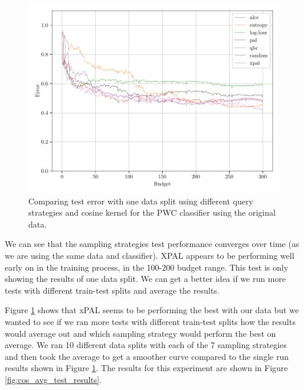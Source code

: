 \begin{figure}[ht]
    \centering
    \includegraphics[width=\textwidth]{../img/plot_text_data_original_compare_stratagies_test_results}
    \caption{Comparing test error with one data split using different query strategies and cosine kernel for the PWC classifier using the original data.}
    \label{fig:cos_test_results}
\end{figure}

We can see that the sampling strategies test performance converges over time (as we are using the same data and classifier). XPAL appears to be performing well early on in the training process, in the 100-200 budget range. This test is only showing the results of one data split. We can get a better idea if we run more tests with different train-test splits and average the results.

Figure \ref{fig:cos_test_results} shows that xPAL seems to be performing the best with our data but we wanted to see if we ran more tests with different train-test splits how the results would average out and which sampling strategy would perform the best on average. We ran 10 different data splits with each of the 7 sampling strategies and then took the average to get a smoother curve compared to the single run results shown in Figure \ref{fig:cos_test_results}. The results for this experiment are shown in Figure \ref{fig:cos_avg_test_results}. 

